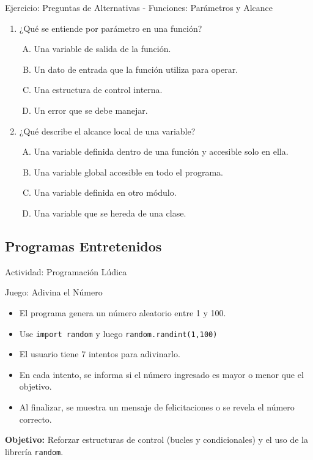 \documentclass[10pt]{beamer}
\begin{document}
\begin{frame}{Ejercicio: Preguntas de Alternativas - Funciones: Parámetros y Alcance} 
    \begin{enumerate} 
        \item ¿Qué se entiende por parámetro en una función? 
        \begin{enumerate}[A)] 
            \item Una variable de salida de la función. 
            \item Un dato de entrada que la función utiliza para operar. 
            \item Una estructura de control interna. 
            \item Un error que se debe manejar. 
        \end{enumerate} 
        \item ¿Qué describe el alcance local de una variable? 
        \begin{enumerate}[A)] 
            \item Una variable definida dentro de una función y accesible solo en ella. 
            \item Una variable global accesible en todo el programa. 
            \item Una variable definida en otro módulo. 
            \item Una variable que se hereda de una clase. 
        \end{enumerate} 
    \end{enumerate}
\end{frame}


\subsection{Programas Entretenidos}
\begin{frame}[fragile]{Actividad: Programación Lúdica}
  \begin{block}{Juego: Adivina el Número}
    \begin{itemize}
      \item El programa genera un número aleatorio entre 1 y 100.
      \item Use \texttt{import random} y luego \texttt{random.randint(1,100)}
      \item El usuario tiene 7 intentos para adivinarlo.
      \item En cada intento, se informa si el número ingresado es mayor o menor que el objetivo.
      \item Al finalizar, se muestra un mensaje de felicitaciones o se revela el número correcto.
    \end{itemize}
  \end{block}
  \vspace{0.2cm}
  \textbf{Objetivo:} Reforzar estructuras de control (bucles y condicionales) y el uso de la librería \texttt{random}.
\end{frame}
\end{document}
